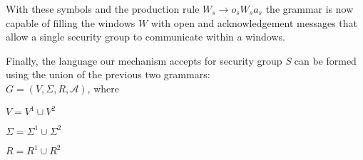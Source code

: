 \documentclass{article}
\newcommand{\tab}{\hspace*{2em}}
\begin{document}
With these symbols and the production rule $W_s\rightarrow o_sW_sa_s$ the grammar is now capable of filling the windows $W$ with open and acknowledgement messages that allow a single security group to communicate within a windows.

Finally, the language our mechanism accepts for security group \emph{S} can be formed using the union of the previous two grammars:\\

\tab $G = (V, \Sigma , R, \mathcal{A})$, where

\tab $V = V^1\cup V^2$

\tab $\Sigma = \Sigma ^1\cup \Sigma ^2$

\tab $R = R^1\cup R^2$
\end{document}
